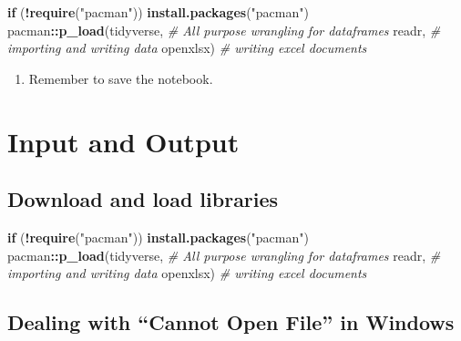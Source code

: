 \documentclass[
]{book}
\newenvironment{Shaded}{\begin{snugshade}}{\end{snugshade}}
\newcommand{\CommentTok}[1]{\textcolor[rgb]{0.56,0.35,0.01}{\textit{#1}}}
\newcommand{\ControlFlowTok}[1]{\textcolor[rgb]{0.13,0.29,0.53}{\textbf{#1}}}
\newcommand{\KeywordTok}[1]{\textcolor[rgb]{0.13,0.29,0.53}{\textbf{#1}}}
\newcommand{\NormalTok}[1]{#1}
\newcommand{\OperatorTok}[1]{\textcolor[rgb]{0.81,0.36,0.00}{\textbf{#1}}}
\newcommand{\StringTok}[1]{\textcolor[rgb]{0.31,0.60,0.02}{#1}}
\providecommand{\tightlist}{%
  \setlength{\itemsep}{0pt}\setlength{\parskip}{0pt}}
\begin{document}
\begin{Shaded}
\begin{Highlighting}[]
\ControlFlowTok{if}\NormalTok{ (}\OperatorTok{!}\KeywordTok{require}\NormalTok{(}\StringTok{"pacman"}\NormalTok{)) }\KeywordTok{install.packages}\NormalTok{(}\StringTok{"pacman"}\NormalTok{)}
\NormalTok{pacman}\OperatorTok{::}\KeywordTok{p_load}\NormalTok{(tidyverse, }\CommentTok{# All purpose wrangling for dataframes}
\NormalTok{               readr, }\CommentTok{# importing and writing data}
\NormalTok{               openxlsx) }\CommentTok{# writing excel documents}
\end{Highlighting}
\end{Shaded}

\begin{enumerate}
\def\labelenumi{\arabic{enumi}.}
\setcounter{enumi}{7}
\tightlist
\item
  Remember to save the notebook.
\end{enumerate}

\hypertarget{input-and-output}{%
\chapter{Input and Output}\label{input-and-output}}

\hypertarget{download-and-load-libraries}{%
\section*{Download and load libraries}\label{download-and-load-libraries}}

\begin{Shaded}
\begin{Highlighting}[]
\ControlFlowTok{if}\NormalTok{ (}\OperatorTok{!}\KeywordTok{require}\NormalTok{(}\StringTok{"pacman"}\NormalTok{)) }\KeywordTok{install.packages}\NormalTok{(}\StringTok{"pacman"}\NormalTok{)}
\NormalTok{pacman}\OperatorTok{::}\KeywordTok{p_load}\NormalTok{(tidyverse, }\CommentTok{# All purpose wrangling for dataframes}
\NormalTok{               readr, }\CommentTok{# importing and writing data}
\NormalTok{               openxlsx) }\CommentTok{# writing excel documents}
\end{Highlighting}
\end{Shaded}

\hypertarget{dealing-with-cannot-open-file-in-windows}{%
\section{Dealing with ``Cannot Open File'' in Windows}\label{dealing-with-cannot-open-file-in-windows}}
\end{document}
